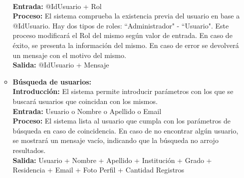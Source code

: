 \begin{enumerate}[A.]
\begin{itemize}
            \\ \textbf{Entrada:} @IdUsuario + Rol
            \\ \textbf{Proceso:} El sistema comprueba la existencia previa del usuario en base a @IdUsuario. Hay dos tipos de roles: ``Administrador" - ``Usuario". Este proceso modificará el Rol del mismo según valor de entrada. En caso de éxito, se presenta la información del mismo. En caso de error se devolverá un mensaje con el motivo del mismo.
            \\ \textbf{Salida:} @IdUsuario + Mensaje
            \\
          \item \textbf{Búsqueda de usuarios:}
            \\ \textbf{Introducción:} El sistema permite introducir parámetros con los que se buscará usuarios que coincidan con los mismos.
            \\ \textbf{Entrada:} Usuario o Nombre o Apellido o Email
            \\ \textbf{Proceso:} El sistema lista al usuario que cumpla con los parámetros de búsqueda en caso de coincidencia. En caso de no encontrar algún usuario, se mostrará un mensaje vacío, indicando que la búsqueda no arrojo resultados.
            \\ \textbf{Salida:} Usuario + Nombre + Apellido + Institución + Grado + Residencia + Email + Foto Perfil + Cantidad Registros
            \\
        \end{itemize}


\end{enumerate}
